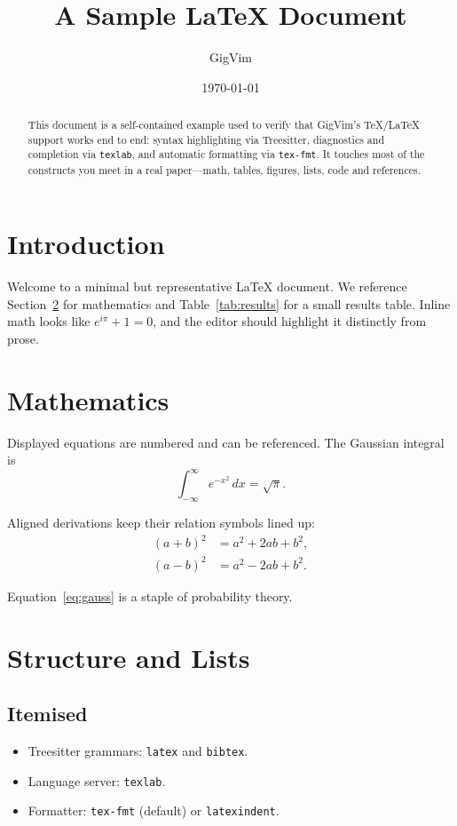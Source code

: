 \documentclass[11pt,a4paper]{article}
\title{A Sample \LaTeX{} Document}
\author{GigVim}
\date{\today}
\begin{document}
\maketitle

\begin{abstract}
  This document is a self-contained example used to verify that GigVim's
  TeX/LaTeX support works end to end: syntax highlighting via Treesitter,
  diagnostics and completion via \texttt{texlab}, and automatic formatting via
  \texttt{tex-fmt}. It touches most of the constructs you meet in a real
  paper---math, tables, figures, lists, code and references.
\end{abstract}

\tableofcontents

\section{Introduction}
\label{sec:intro}

Welcome to a minimal but representative \LaTeX{} document. We reference
Section~\ref{sec:math} for mathematics and Table~\ref{tab:results} for a small
results table. Inline math looks like $e^{i\pi} + 1 = 0$, and the editor should
highlight it distinctly from prose.

\section{Mathematics}
\label{sec:math}

Displayed equations are numbered and can be referenced. The Gaussian integral is
\begin{equation}
  \label{eq:gauss}
  \int_{-\infty}^{\infty} e^{-x^{2}} \, dx = \sqrt{\pi}.
\end{equation}

Aligned derivations keep their relation symbols lined up:
\begin{align}
  (a + b)^{2} &= a^{2} + 2ab + b^{2}, \\
  (a - b)^{2} &= a^{2} - 2ab + b^{2}.
\end{align}

Equation~\eqref{eq:gauss} is a staple of probability theory.

\section{Structure and Lists}
\label{sec:lists}

\subsection{Itemised}
\begin{itemize}
  \item Treesitter grammars: \texttt{latex} and \texttt{bibtex}.
  \item Language server: \texttt{texlab}.
  \item Formatter: \texttt{tex-fmt} (default) or \texttt{latexindent}.
\end{itemize}
\end{document}

